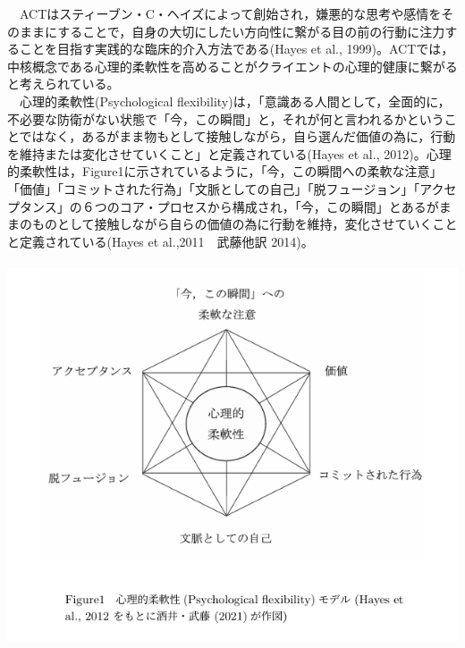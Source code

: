 \documentclass[12pt,a4paper,xelatex,ja=standard]{bxjsarticle}
\begin{document}
　ACTはスティーブン・C・ヘイズによって創始され，嫌悪的な思考や感情をそのままにすることで，自身の大切にしたい方向性に繋がる目の前の行動に注力することを目指す実践的な臨床的介入方法である(Hayes
et al.,
1999)。ACTでは，中核概念である心理的柔軟性を高めることがクライエントの心理的健康に繋がると考えられている。\\
　心理的柔軟性(Psychological
flexibility)は，「意識ある人間として，全面的に，不必要な防衛がない状態で「今，この瞬間」と，それが何と言われるかということではなく，あるがまま物もとして接触しながら，自ら選んだ価値の為に，行動を維持または変化させていくこと」と定義されている(Hayes
et al.,
2012)。心理的柔軟性は，Figure1に示されているように，「今，この瞬間への柔軟な注意」「価値」「コミットされた行為」「文脈としての自己」「脱フュージョン」「アクセプタンス」の６つのコア・プロセスから構成され，「今，この瞬間」とあるがままのものとして接触しながら自らの価値の為に行動を維持，変化させていくことと定義されている(Hayes
et al.,2011　武藤他訳 2014)。\\
　\includegraphics{ACT2.png}
\end{document}
